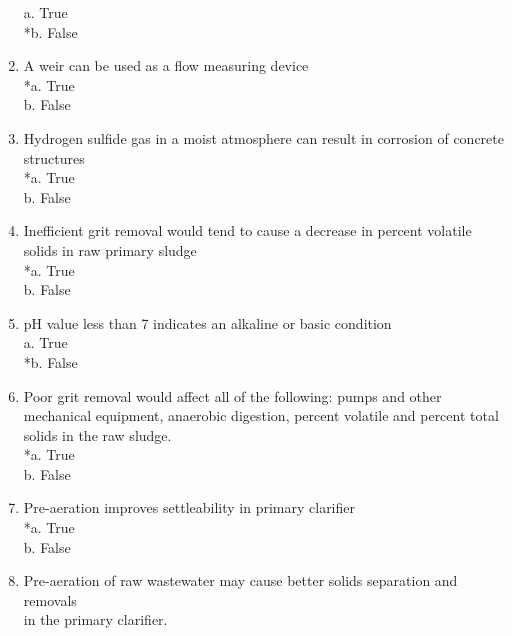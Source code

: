 \begin{enumerate}
a. True \\
*b. False 

\vspace{0.4cm}
\item  A weir can be used as a flow measuring device \\

*a. True \\
b. False 

\vspace{0.4cm}
\item  Hydrogen sulfide gas in a moist atmosphere can result in corrosion of concrete structures \\

*a. True \\
b. False 

\vspace{0.4cm}
\item  Inefficient grit removal would tend to cause a decrease in percent volatile solids in raw primary sludge \\

*a. True \\
b. False 

\vspace{0.4cm}
\item  pH value less than 7 indicates an alkaline or basic condition \\

a. True \\
*b. False 

\vspace{0.4cm}
\item  Poor grit removal would affect all of the following: pumps and other mechanical equipment, anaerobic digestion, percent volatile and percent total solids in the raw sludge. \\

*a. True \\
b. False 

\vspace{0.4cm}
\item  Pre-aeration improves settleability in primary clarifier \\

*a. True \\
b. False 

\vspace{0.4cm}
\item  Pre-aeration of raw wastewater may cause better solids separation and removals\\
in the primary clarifier. \\


\end{enumerate}
